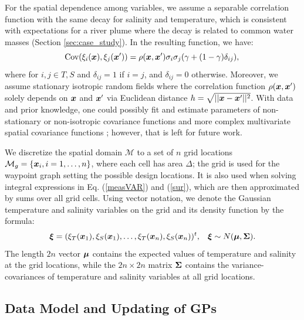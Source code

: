 \documentclass[aoas]{imsart}
\begin{document}
For the spatial dependence among variables, we assume a separable
correlation function with the same decay for salinity and temperature,
which is consistent with expectations for a river plume where the
decay is related to common water masses (Section
\ref{sec:case_study}). In the resulting function, we have:
\begin{equation}\label{gp_corr}
\mbox{Cov}(\xi_i(\bx),\xi_j(\bx')) = \rho(\bx,\bx') \sigma_i \sigma_j (\gamma +(1-\gamma )\delta_{ij}), \\
\end{equation}
where for $i,j \in {T,S}$ and $\delta_{ij}=1$ if $i=j$, and
$\delta_{ij}=0$ otherwise. Moreover, we assume stationary isotropic
random fields where the correlation function $\rho({\boldsymbol x},{\boldsymbol x}')$
solely depends on ${\boldsymbol x}$ and ${\boldsymbol x}'$ via Euclidean distance
$h=\sqrt{||{\boldsymbol x}-{\boldsymbol x}'||^2}$. With data and prior knowledge, one could
possibly fit and estimate parameters of non-stationary or
non-isotropic covariance functions and more complex multivariate
spatial covariance functions
\citep{gneiting2010matern,genton2015cross}; however, that is left for
future work.

We discretize the spatial domain $\mathcal{M}$ to a set of $n$ grid
locations $\mathcal{M}_g = \{{\boldsymbol x}_i, i=1,\ldots,n \}$, where each cell
has area $\Delta$; the grid is used for the waypoint graph setting the
possible design locations. It is also used when solving integral
expressions in Eq. (\ref{measVAR}) and (\ref{sur}), which are then
approximated by sums over all grid cells. Using vector notation, we
denote the Gaussian temperature and salinity variables on the grid and
its density function by the formula:
\begin{equation}\label{prior}
    \bxi = (\xi_T(\bx_1),\xi_S(\bx_1),\ldots,\xi_T(\bx_n),\xi_S(\bx_n))^t, \hspace{3mm}
    \bxi  \sim  N(\bmu, \bSigma). %
\end{equation}
The length $2n$ vector ${\boldsymbol \mu}$ contains the expected values of
temperature and salinity at the grid locations, while the
$2n \times 2n$ matrix ${\boldsymbol \Sigma}$ contains the
variance-covariances of temperature and salinity variables at all grid
locations.

\subsection{Data Model and Updating of GPs}
\end{document}
